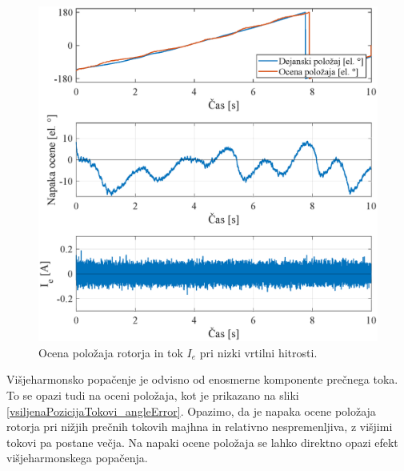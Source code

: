 \documentclass[a4paper,twoside,openright,12pt,slovene]{book}
\begin{document}
\begin{figure}[!htbp]
    \centering
    \includegraphics[width=0.99\columnwidth]{Slike/HighLoadRun.eps}
    \caption{\label{HighLoadRun} Ocena položaja rotorja in tok $I_e$ pri nizki vrtilni hitrosti. }
\end{figure}

\newpage 

Višjeharmonsko popačenje je odvisno od enosmerne komponente prečnega toka. To se opazi tudi na oceni položaja, kot je prikazano na sliki \ref{vsiljenaPozicijaTokovi_angleError}. Opazimo, da je napaka
ocene položaja rotorja pri nižjih prečnih tokovih majhna in relativno nespremenljiva, z višjimi tokovi pa postane večja. Na napaki ocene položaja se lahko direktno opazi efekt višjeharmonskega
popačenja. 
\end{document}
